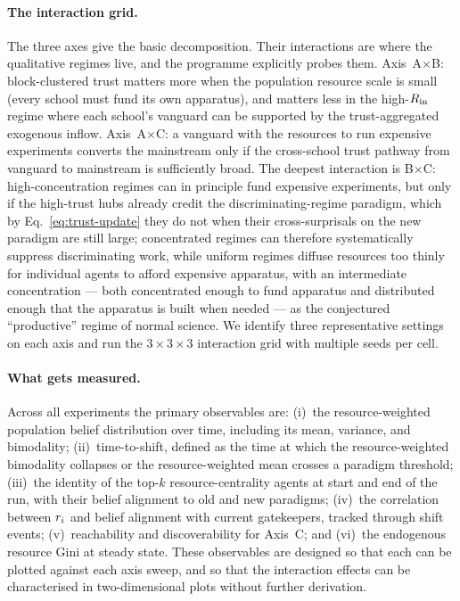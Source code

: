 \paragraph{The interaction grid.}
The three axes give the basic decomposition. Their interactions are
where the qualitative regimes live, and the programme explicitly
probes them. Axis~A$\times$B: block-clustered trust matters more
when the population resource scale is small (every school must fund
its own apparatus), and matters less in the high-$R_{\mathrm{in}}$ regime
where each school's vanguard can be supported by the trust-aggregated
exogenous inflow. Axis~A$\times$C: a vanguard with the resources to
run expensive experiments converts the mainstream only if the
cross-school trust pathway from vanguard to mainstream is
sufficiently broad. The deepest interaction is B$\times$C:
high-concentration regimes can in principle fund expensive
experiments, but only if the high-trust hubs already credit the
discriminating-regime paradigm, which by Eq.~\eqref{eq:trust-update}
they do not when their cross-surprisals on the new paradigm are still
large; concentrated regimes can therefore systematically suppress
discriminating work, while uniform regimes diffuse resources too
thinly for individual agents to afford expensive apparatus, with an
intermediate concentration --- both concentrated enough to fund
apparatus and distributed enough that the apparatus is built when
needed --- as the conjectured ``productive'' regime of normal science.
We identify three representative settings on each axis and run the
$3\times3\times3$ interaction grid with multiple seeds per cell.

\paragraph{What gets measured.}
Across all experiments the primary observables are:
(i)~the resource-weighted population belief distribution over time,
including its mean, variance, and bimodality;
(ii)~time-to-shift, defined as the time at which the
resource-weighted bimodality collapses or the resource-weighted mean
crosses a paradigm threshold;
(iii)~the identity of the top-$k$ resource-centrality agents at
start and end of the run, with their belief alignment to old and new
paradigms;
(iv)~the correlation between $r_{i}$ and belief alignment with
current gatekeepers, tracked through shift events;
(v)~reachability and discoverability for Axis~C; and
(vi)~the endogenous resource Gini at steady state.
These observables are designed so that each can be plotted against
each axis sweep, and so that the interaction effects can be
characterised in two-dimensional plots without further derivation.

